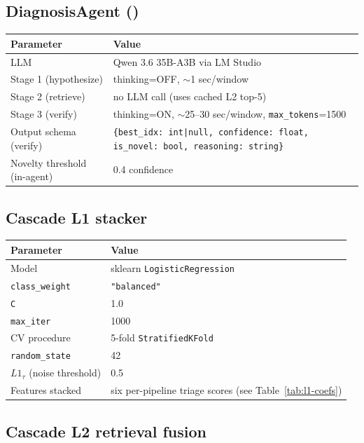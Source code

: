 \subsection{DiagnosisAgent (\agent{})}

\begin{table}[h]
\centering
\small
\begin{tabular}{ll}
\toprule
Parameter & Value \\
\midrule
LLM & Qwen 3.6 35B-A3B via LM Studio \\
Stage 1 (hypothesize) & thinking=OFF, $\sim$1 sec/window \\
Stage 2 (retrieve) & no LLM call (uses cached L2 top-5) \\
Stage 3 (verify) & thinking=ON, $\sim$25--30 sec/window, \texttt{max\_tokens}=1500 \\
Output schema (verify) & \texttt{\{best\_idx: int|null, confidence: float, is\_novel: bool, reasoning: string\}} \\
Novelty threshold (in-agent) & 0.4 confidence \\
\bottomrule
\end{tabular}
\end{table}

\subsection{Cascade L1 stacker}

\begin{table}[h]
\centering
\small
\begin{tabular}{ll}
\toprule
Parameter & Value \\
\midrule
Model & sklearn \texttt{LogisticRegression} \\
\texttt{class\_weight} & \texttt{"balanced"} \\
\texttt{C} & 1.0 \\
\texttt{max\_iter} & 1000 \\
CV procedure & 5-fold \texttt{StratifiedKFold} \\
\texttt{random\_state} & 42 \\
$L1_{\tau}$ (noise threshold) & 0.5 \\
Features stacked & six per-pipeline triage scores (see Table~\ref{tab:l1-coefs}) \\
\bottomrule
\end{tabular}
\end{table}

\subsection{Cascade L2 retrieval fusion}

